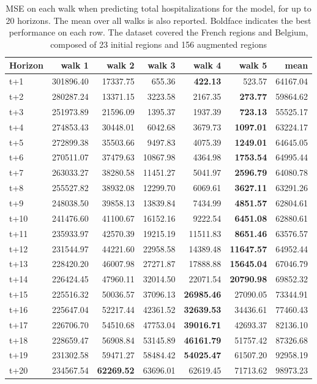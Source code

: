 \begin{table}[H]
\centering
\caption{MSE on each walk when predicting total hospitalizations for the model, for up to 20 horizons. The mean over all walks is also reported. Boldface indicates the best performance on each row. The dataset covered the French regions and Belgium, composed of 23 initial regions and 156 augmented regions }
\label{tab:MSE_walk_encoder_decoder}
\begin{tabular}{lrrrrrr}
\toprule
Horizon &    walk 1 &   walk 2 &   walk 3 &   walk 4 &   walk 5 &     mean \\
\midrule
t+1  & 301896.40  & 17337.75  & 655.36  & \textbf{422.13}  & 523.57  & 64167.04  \\
t+2  & 280287.24  & 13371.15  & 3223.58  & 2167.35  & \textbf{273.77}  & 59864.62  \\
t+3  & 251973.89  & 21596.09  & 1395.37  & 1937.39  & \textbf{723.13}  & 55525.17  \\
t+4  & 274853.43  & 30448.01  & 6042.68  & 3679.73  & \textbf{1097.01}  & 63224.17  \\
t+5  & 272899.38  & 35503.66  & 9497.83  & 4075.39  & \textbf{1249.01}  & 64645.05  \\
t+6  & 270511.07  & 37479.63  & 10867.98  & 4364.98  & \textbf{1753.54}  & 64995.44  \\
t+7  & 263033.27  & 38280.58  & 11451.27  & 5041.97  & \textbf{2596.79}  & 64080.78  \\
t+8  & 255527.82  & 38932.08  & 12299.70  & 6069.61  & \textbf{3627.11}  & 63291.26  \\
t+9  & 248038.50  & 39858.13  & 13839.84  & 7434.99  & \textbf{4851.57}  & 62804.61  \\
t+10  & 241476.60  & 41100.67  & 16152.16  & 9222.54  & \textbf{6451.08}  & 62880.61  \\
t+11  & 235933.97  & 42570.39  & 19215.19  & 11511.83  & \textbf{8651.46}  & 63576.57  \\
t+12  & 231544.97  & 44221.60  & 22958.58  & 14389.48  & \textbf{11647.57}  & 64952.44  \\
t+13  & 228420.20  & 46007.98  & 27271.87  & 17888.88  & \textbf{15645.04}  & 67046.79  \\
t+14  & 226424.45  & 47960.11  & 32014.50  & 22071.54  & \textbf{20790.98}  & 69852.32  \\
t+15  & 225516.32  & 50036.57  & 37096.13  & \textbf{26985.46}  & 27090.05  & 73344.91  \\
t+16  & 225647.04  & 52217.44  & 42361.52  & \textbf{32639.53}  & 34436.61  & 77460.43  \\
t+17  & 226706.70  & 54510.68  & 47753.04  & \textbf{39016.71}  & 42693.37  & 82136.10  \\
t+18  & 228659.47  & 56908.84  & 53145.89  & \textbf{46161.79}  & 51757.42  & 87326.68  \\
t+19  & 231302.58  & 59471.27  & 58484.42  & \textbf{54025.47}  & 61507.20  & 92958.19  \\
t+20  & 234567.54  & \textbf{62269.52}  & 63696.01  & 62619.45  & 71713.62  & 98973.23  \\

\bottomrule
\end{tabular}
\end{table}
